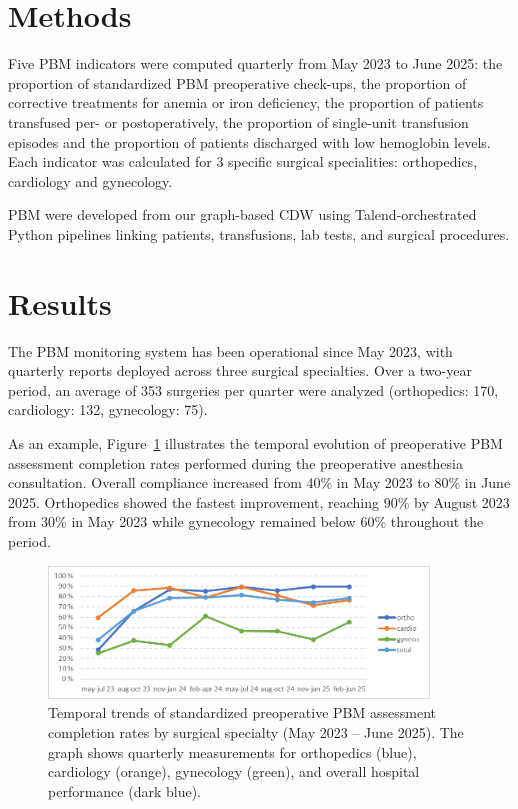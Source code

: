 \documentclass{IOS-Book-Article}
\begin{document}
\section{Methods}

Five PBM indicators were computed quarterly from May 2023 to June 2025: the proportion of standardized PBM preoperative check-ups, the proportion of corrective treatments for anemia or iron deficiency, the proportion of patients transfused per- or postoperatively, the proportion of single-unit transfusion episodes and the proportion of patients discharged with low hemoglobin levels. Each indicator was calculated for 3 specific surgical specialities: orthopedics, cardiology and gynecology. 

PBM were developed from our graph-based CDW \cite{Cance2022,Artemova2019}
using Talend-orchestrated Python pipelines linking patients, transfusions, lab tests, and surgical procedures.

\section{Results}

The PBM monitoring system has been operational since May 2023, with quarterly 
reports deployed across three surgical specialties. Over a two-year period, an 
average of 353 surgeries per quarter were analyzed (orthopedics: 170, 
cardiology: 132, gynecology: 75).

As an example, Figure~\ref{fig:pbm_trends} illustrates the temporal evolution of preoperative 
PBM assessment completion rates performed during the preoperative anesthesia consultation. Overall compliance increased from 40\% in May 2023 to 80\% in June 2025. Orthopedics showed the fastest improvement, reaching 90\% by August 2023 from 30\% in May 2023 while gynecology remained below 60\% throughout the period.

\begin{figure}[h!]
\centering
\includegraphics[width=0.9\textwidth]{figure.png}
\caption{Temporal trends of standardized preoperative PBM assessment completion rates by surgical specialty (May 2023 -- June 2025). The graph shows quarterly measurements for orthopedics (blue), cardiology (orange), gynecology (green), and overall hospital performance (dark blue).}
\label{fig:pbm_trends}
\vspace{-1em}
\end{figure}
\end{document}
